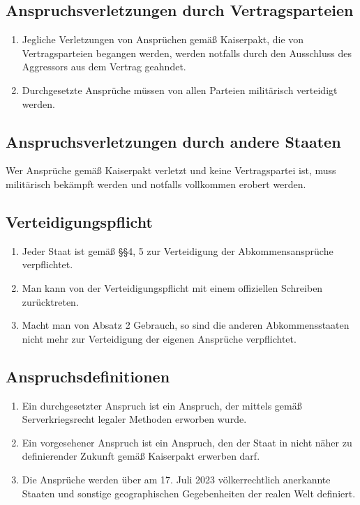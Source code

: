 \documentclass{article}
\begin{document}
\subsection{Anspruchsverletzungen durch Vertragsparteien}
\begin{enumerate}[(1)]
    \item Jegliche Verletzungen von Ansprüchen gemäß Kaiserpakt, die von Vertragsparteien begangen werden, werden notfalls durch den Ausschluss des Aggressors aus dem Vertrag geahndet.
    \item Durchgesetzte Ansprüche müssen von allen Parteien militärisch verteidigt werden.
\end{enumerate}

\subsection{Anspruchsverletzungen durch andere Staaten}
Wer Ansprüche gemäß Kaiserpakt verletzt und keine Vertragspartei ist, muss militärisch bekämpft werden und notfalls vollkommen erobert werden.

\subsection{Verteidigungspflicht}
\begin{enumerate}[(1)]
    \item Jeder Staat ist gemäß §§4, 5 zur Verteidigung der Abkommensansprüche verpflichtet.
    \item Man kann von der Verteidigungspflicht mit einem offiziellen Schreiben zurücktreten.
    \item Macht man von Absatz 2 Gebrauch, so sind die anderen Abkommensstaaten nicht mehr zur Verteidigung der eigenen Ansprüche verpflichtet.
\end{enumerate}

\subsection{Anspruchsdefinitionen}
\begin{enumerate}[(1)]
    \item Ein durchgesetzter Anspruch ist ein Anspruch, der mittels gemäß Serverkriegsrecht legaler Methoden erworben wurde.
    \item Ein vorgesehener Anspruch ist ein Anspruch, den der Staat in nicht näher zu definierender Zukunft gemäß Kaiserpakt erwerben darf. 
    \item Die Ansprüche werden über am 17. Juli 2023 völkerrechtlich anerkannte Staaten und sonstige geographischen Gegebenheiten der realen Welt definiert.
\end{enumerate}
\end{document}
